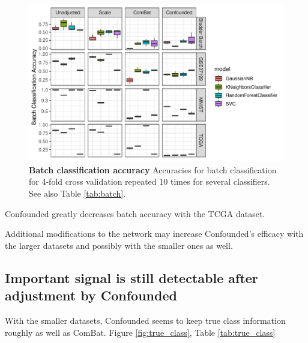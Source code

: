 \documentclass[notitlepage]{article}
\begin{document}
\begin{figure}
	\centering
	\includegraphics[width=\columnwidth]{figures/final/batch_accuracy}
	\caption{\textbf{Batch classification accuracy} Accuracies for batch classification for 4-fold cross validation repeated 10 times for several classifiers.
	See also Table \ref{tab:batch}.}
	\label{fig:batch}
\end{figure}
\begin{table}
	\centering
	
	\caption{\textbf{Batch classification accuracy} for several datasets and adjusters.
	The ideal batch adjuster would completely remove all signal due to batch and would therefore \textit{decrease} batch classification accuracy to around the baseline for all classifiers.
	See also Figure \ref{fig:batch}.}
	\label{tab:batch}
\end{table}

Confounded greatly decreases batch accuracy with the TCGA dataset.

Additional modifications to the network may increase Confounded's efficacy with the larger datasets and possibly with the smaller ones as well.

\subsection{Important signal is still detectable after adjustment by Confounded}

With the smaller datasets, Confounded seems to keep true class information roughly as well as ComBat.
Figure \ref{fig:true_class}, Table \ref{tab:true_class}
\end{document}
